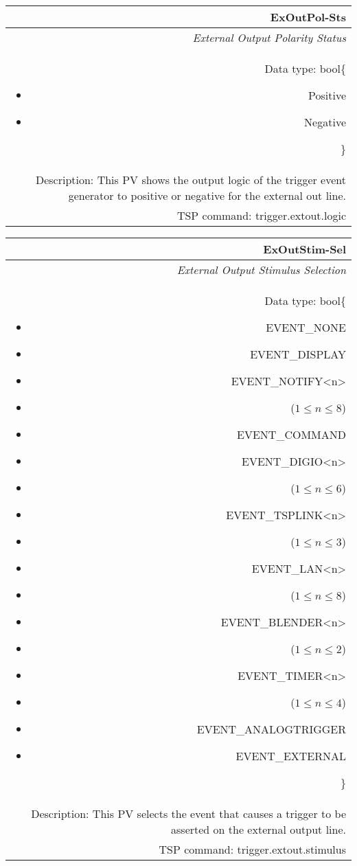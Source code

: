 \documentclass[openany]{article}
\begin{document}
		\begin{tabular}{N}
			\hline
			\bfseries ExOutPol-Sts\label{pv:exoutpol-sts} \\ \hline
			\emph{External Output Polarity Status} \\
			Data type: bool\{\begin{itemize}[noitemsep]
				\small
				\item[] Positive
				\item[] Negative
			\end{itemize}\} \\
			Description: This PV shows the output logic of the trigger event generator to positive or negative for the external out line. \\
			TSP command: trigger.extout.logic
		\end{tabular}

		\begin{tabular}{N}
			\hline
			\bfseries ExOutStim-Sel\label{pv:exoutstim-sel} \\ \hline
			\emph{External Output Stimulus Selection} \\
			Data type: bool\{\begin{itemize}[noitemsep]
				\small
				\item[] EVENT\_NONE
				\item[] EVENT\_DISPLAY
				\item[] EVENT\_NOTIFY\textless n\textgreater
				\item[] ($1\leq n\leq 8$)
				\item[] EVENT\_COMMAND
				\item[] EVENT\_DIGIO\textless n\textgreater
				\item[] ($1\leq n\leq 6$)
				\item[] EVENT\_TSPLINK\textless n\textgreater
				\item[] ($1\leq n\leq 3$)
				\item[] EVENT\_LAN\textless n\textgreater
				\item[] ($1\leq n\leq 8$)
				\item[] EVENT\_BLENDER\textless n\textgreater 
				\item[] ($1\leq n\leq 2$)
				\item[] EVENT\_TIMER\textless n\textgreater
				\item[] ($1\leq n\leq 4$)
				\item[] EVENT\_ANALOGTRIGGER
				\item[] EVENT\_EXTERNAL
			\end{itemize}\} \\
			Description: This PV selects the event that causes a trigger to be asserted on the external output line. \\
			TSP command: trigger.extout.stimulus
		\end{tabular}
\end{document}
